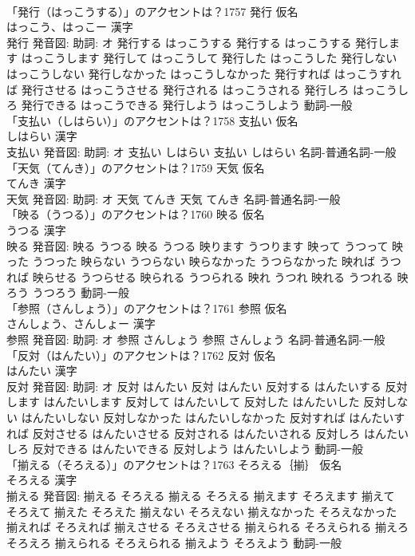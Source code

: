 \documentclass[8pt]{extreport}
\begin{document}
\begin{CJK}{UTF8}{min}
\\	「発行（はっこうする）」のアクセントは？1757	発行 仮名　
\\	はっこう、はっこー 漢字　
\\	発行 発音図: 助詞: オ	発行する はっこうする		発行する はっこうする 発行します はっこうします 発行して はっこうして 発行した はっこうした 発行しない はっこうしない 発行しなかった はっこうしなかった 発行すれば はっこうすれば 発行させる はっこうさせる 発行される はっこうされる 発行しろ はっこうしろ 発行できる はっこうできる 発行しよう はっこうしよう				動詞-一般 
\\	「支払い（しはらい）」のアクセントは？1758	支払い 仮名　
\\	しはらい 漢字　
\\	支払い 発音図: 助詞: オ	支払い しはらい		支払い しはらい				名詞-普通名詞-一般 
\\	「天気（てんき）」のアクセントは？1759	天気 仮名　
\\	てんき 漢字　
\\	天気 発音図: 助詞: オ	天気 てんき		天気 てんき				名詞-普通名詞-一般 
\\	「映る（うつる）」のアクセントは？1760	映る 仮名　
\\	うつる 漢字　
\\	映る 発音図:	映る うつる		映る うつる 映ります うつります 映って うつって 映った うつった 映らない うつらない 映らなかった うつらなかった 映れば うつれば 映らせる うつらせる 映られる うつられる 映れ うつれ 映れる うつれる 映ろう うつろう				動詞-一般 
\\	「参照（さんしょう）」のアクセントは？1761	参照 仮名　
\\	さんしょう、さんしょー 漢字　
\\	参照 発音図: 助詞: オ	参照 さんしょう		参照 さんしょう				名詞-普通名詞-一般 
\\	「反対（はんたい）」のアクセントは？1762	反対 仮名　
\\	はんたい 漢字　
\\	反対 発音図: 助詞: オ	反対 はんたい		反対 はんたい 反対する はんたいする 反対します はんたいします 反対して はんたいして 反対した はんたいした 反対しない はんたいしない 反対しなかった はんたいしなかった 反対すれば はんたいすれば 反対させる はんたいさせる 反対される はんたいされる 反対しろ はんたいしろ 反対できる はんたいできる 反対しよう はんたいしよう				動詞-一般 
\\	「揃える（そろえる）」のアクセントは？1763	そろえる｛揃｝ 仮名　
\\	そろえる 漢字　
\\	揃える 発音図:	揃える そろえる		揃える そろえる 揃えます そろえます 揃えて そろえて 揃えた そろえた 揃えない そろえない 揃えなかった そろえなかった 揃えれば そろえれば 揃えさせる そろえさせる 揃えられる そろえられる 揃えろ そろえろ 揃えられる そろえられる 揃えよう そろえよう				動詞-一般 

\end{CJK}
\end{document}
